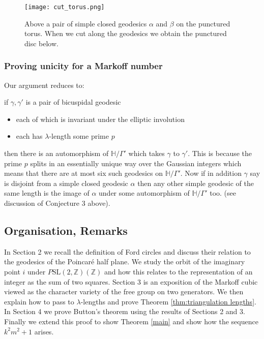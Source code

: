 \documentclass[12pt,a4paper]{amsart}
\def\HH{\mathbb{H}}
\def\xx{\HH/\Gamma'}
\def\ZZ{\mathbb{Z}}
\def\sl2{\mathrm{SL}(2, \ZZ)}
\begin{document}
\begin{figure}[ht]
\begin{center}
\texttt{[image: cut\_torus.png]}
\end{center}

\caption{Above a pair of simple closed geodesics $\alpha$ and $\beta$ on the
punctured torus. When we cut along the geodesics we obtain the punctured disc
below.}

	\label{fig: cut torus}
\end{figure}

\subsubsection{Proving unicity for a Markoff number} 
Our argument reduces to:

if $\gamma, \gamma'$ is a pair of  bicuspidal geodesic 

\begin{itemize}	
\item each of which is invariant under the elliptic involution 
\item each has  $\lambda$-length some prime $p$ 
\end{itemize}	

then there is an automorphism of $\xx$ which takes $\gamma$ to $\gamma'$. This
is because  the prime $p$ splits in an essentially unique way over the Gaussian
integers which means that there are at most six such geodesics on $\xx$. Now if
in addition $\gamma$ say is disjoint from a simple closed geodesic $\alpha$ then
any other simple geodesic of the same length is the image of $\alpha$ under
some automorphism of $\xx$ too. (see discussion of Conjecture 3 \cite{mcp}
above).

\subsection{Organisation, Remarks}

In Section 2 we recall the definition of Ford circles and discuss their
relation to the geodesics of the Poincaré half plane. We study the orbit of the
imaginary point $i$ under $P\sl2(\ZZ)$ and how this relates to the
representation of an integer as the sum of two squares. Section 3  is an
exposition of the Markoff cubic viewed as the character variety of the free
group on two generators. We then explain how to pass to $\lambda$-lengths and
prove Theorem \ref{thm:triangulation lengths}. In Section 4 we prove Button's
theorem using the results of Sections 2 and  3.  Finally we extend this proof
to show Theorem \ref{main} and show how the sequence $k^2m^2 + 1$ arises. 
\end{document}
